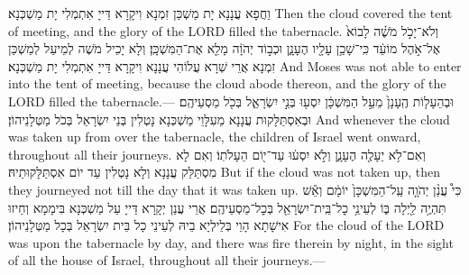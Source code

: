 {{וַחֲפָא עֲנָנָא יָת מַשְׁכַּן זִמְנָא וִיקָרָא דַּייָ אִתְמְלִי יָת מַשְׁכְּנָא׃}
{Then the cloud covered the tent of meeting, and the glory of the LORD filled the tabernacle.}{}
{וְלֹא־יָכֹ֣ל מֹשֶׁ֗ה לָבוֹא֙ אֶל־אֹ֣הֶל מוֹעֵ֔ד כִּֽי־שָׁכַ֥ן עָלָ֖יו הֶעָנָ֑ן וּכְב֣וֹד יְהֹוָ֔ה מָלֵ֖א אֶת־הַמִּשְׁכָּֽן׃
}
{וְלָא יָכֵיל מֹשֶׁה לְמֵיעַל לְמַשְׁכַּן זִמְנָא אֲרֵי שְׁרָא עֲלוֹהִי עֲנָנָא וִיקָרָא דַּייָ אִתְמְלִי יָת מַשְׁכְּנָא׃}
{And Moses was not able to enter into the tent of meeting, because the cloud abode thereon, and the glory of the LORD filled the tabernacle.—}{}
{וּבְהֵעָל֤וֹת הֶֽעָנָן֙ מֵעַ֣ל הַמִּשְׁכָּ֔ן יִסְע֖וּ בְּנֵ֣י יִשְׂרָאֵ֑ל בְּכֹ֖ל מַסְעֵיהֶֽם׃}
{וּבְאִסְתַּלָּקוּת עֲנָנָא מֵעִלָּוֵי מַשְׁכְּנָא נָטְלִין בְּנֵי יִשְׂרָאֵל בְּכֹל מַטְּלָנֵיהוֹן׃}
{And whenever the cloud was taken up from over the tabernacle, the children of Israel went onward, throughout all their journeys.}{}
{וְאִם־לֹ֥א יֵעָלֶ֖ה הֶעָנָ֑ן וְלֹ֣א יִסְע֔וּ עַד־י֖וֹם הֵעָלֹתֽוֹ׃}
{וְאִם לָא מִסְתַּלַּק עֲנָנָא וְלָא נָטְלִין עַד יוֹם אִסְתַּלָּקוּתֵיהּ׃}
{But if the cloud was not taken up, then they journeyed not till the day that it was taken up.}{}
{כִּי֩ עֲנַ֨ן יְהֹוָ֤ה עַֽל־הַמִּשְׁכָּן֙ יוֹמָ֔ם וְאֵ֕שׁ תִּהְיֶ֥ה לַ֖יְלָה בּ֑וֹ לְעֵינֵ֥י כׇל־בֵּֽית־יִשְׂרָאֵ֖ל בְּכׇל־מַסְעֵיהֶֽם׃
}
{אֲרֵי עֲנַן יְקָרָא דַּייָ עַל מַשְׁכְּנָא בִּימָמָא וְחֵיזוּ אִישָׁתָא הָוֵי בְּלֵילְיָא בֵיהּ לְעֵינֵי כָל בֵּית יִשְׂרָאֵל בְּכָל מַטְּלָנֵיהוֹן׃}
{For the cloud of the LORD was upon the tabernacle by day, and there was fire therein by night, in the sight of all the house of Israel, throughout all their journeys.—}{}
}
